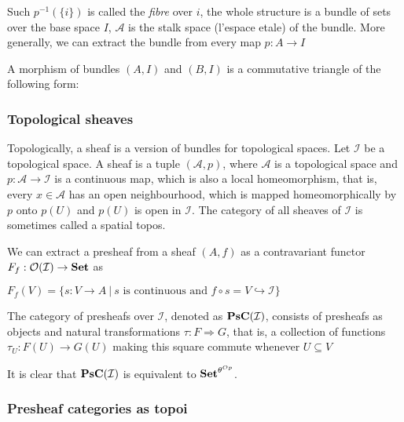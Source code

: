 \documentclass[a4paper]{article}
\theoremstyle{defin}
\theoremstyle{theorem}
\theoremstyle{claim}
\theoremstyle{prop}
\theoremstyle{lemma}
\theoremstyle{fact}
\theoremstyle{ex}
\theoremstyle{col}
\begin{document}
Such $p^{-1}(\{ i \})$ is called the \emph{fibre} over $i$, the whole structure is a bundle of sets over the base space $I$, $\mathcal{A}$ is the stalk space (l'espace etale) of the bundle. More generally, we can extract the bundle from every map $p : A \to I$

A morphism of bundles $(A, I)$ and $(B, I)$ is a commutative triangle of the following form:
\centerline{
}

\subsubsection{Topological sheaves}

Topologically, a sheaf is a version of bundles for topological spaces. Let $\mathcal{I}$ be a topological space. A sheaf is a tuple $(\mathcal{A}, p)$, where $\mathcal{A}$ is a topological space and $p : \mathcal{A} \to \mathcal{I}$ is a continuous map, which is also a local homeomorphism, that is, every $x \in \mathcal{A}$ has an open neighbourhood, which is mapped homeomorphically by $p$ onto $p(U)$ and $p(U)$ is open in $\mathcal{I}$. The category of all sheaves of $\mathcal{I}$ is sometimes called a spatial topos.

We can extract a presheaf from a sheaf $(A, f)$ as a contravariant functor $F_f : \mathcal{O}(\mathcal{I}) \to {\bf Set}$ as
\begin{center}
$F_f(V) = \{ s : V \to A \: | \: \text{$s$ is continuous and $f \circ s = V \hookrightarrow \mathcal{I} $}\}$
\end{center}

The category of presheafs over $\mathcal{I}$, denoted as ${\bf PsC}(\mathcal{I})$, consists of presheafs as objects and natural transformations $\tau : F \Rightarrow G$, that is, a collection of functions $\tau_U : F(U) \to G(U)$ making this square commute whenever $U \subseteq V$

\centerline{
}

It is clear that ${\bf PsC}(\mathcal{I})$ is equivalent to ${\bf Set}^{\theta^{Op}}$.

\subsubsection{Presheaf categories as topoi}
\end{document}
